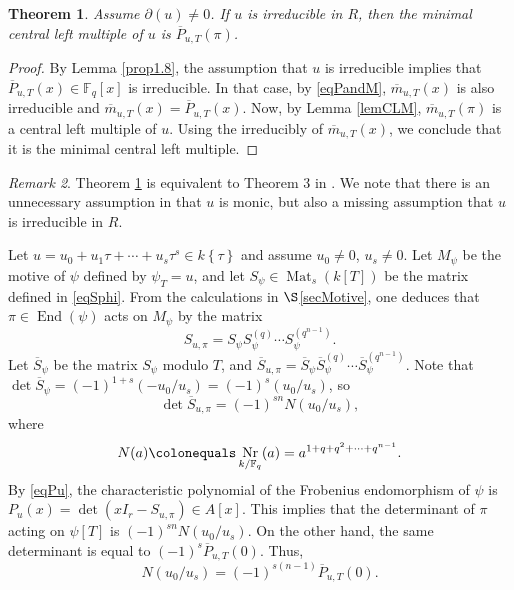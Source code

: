 \documentclass[12pt]{amsart}
\newtheorem{thm}{Theorem}[section]
\newtheorem{cor}[thm]{Corollary}
\theoremstyle{definition}
\theoremstyle{remark}
\newtheorem{rem}[thm]{Remark}
\numberwithin{equation}{section}
\numberwithin{thm}{section}
\DeclareMathOperator{\End}{End}
\DeclareMathOperator{\Mat}{Mat}
\DeclareMathOperator{\Nr}{Nr}
\newcommand{\F}{\mathbb{F}}
\newcommand{\twist}[1]{#1\!\left\{\tau\right\}}
\begin{document}


\begin{thm}\label{thm2.5} Assume $\partial(u)\neq 0$. 
	If $u$ is irreducible in $R$, then the minimal central left multiple of $u$ is $\overline{P}_{u, T}(\pi)$. 
\end{thm}
\begin{proof}
	By Lemma  \ref{prop1.8}, the assumption that $u$ is irreducible implies that 
	$\overline{P}_{u, T}(x)\in \F_q[x]$ is irreducible. In that case, by \eqref{eqPandM}, $\overline{m}_{u, T}(x)$ is also irreducible and 
	$\overline{m}_{u, T}(x)= \overline{P}_{u, T}(x)$. Now, by Lemma \ref{lemCLM}, $\overline{m}_{u, T}(\pi)$ is 
	a central left multiple of $u$. Using the irreducibly of $\overline{m}_{u, T}(x)$, we conclude that it is the 
	minimal central left multiple. 
\end{proof}

\begin{rem} Theorem \ref{thm2.5} is equivalent to Theorem 3 in \cite{Sheekey}. We note that there is an unnecessary assumption in \cite{Sheekey} that  
$u$ is monic, but also a missing assumption that $u$ 
	is irreducible in $R$. %
\end{rem}

Let $u=u_0+u_1\tau+\cdots+u_s\tau^s \in \twist{k}$ and assume $u_0\neq 0$, $u_s\neq 0$. 
Let $M_\psi$ be the motive of $\psi$ defined by $\psi_T=u$, and let  $S_\psi\in \Mat_{s}(k[T])$ be the matrix defined in \eqref{eqSphi}. From the calculations in 
$\S$\ref{secMotive}, one deduces that $\pi\in \End(\psi)$ acts on $M_\psi$ by the matrix 
$$S_{u, \pi}=S_\psi S_\psi^{(q)}\cdots S_\psi^{(q^{n-1})}.$$ 
Let $\overline{S}_{\psi}$ be the matrix $S_{\psi}$ modulo $T$, and 
$\overline{S}_{u, \pi}=\overline{S}_\psi\overline{S}_\psi^{(q)}\cdots \overline{S}_\psi^{(q^{n-1})}$. 
Note that 
$\det\overline{S}_{\psi}=(-1)^{1+s}(-u_0/u_s)=(-1)^s(u_0/u_s)$, 
so 
$$
\det \overline{S}_{u, \pi}= (-1)^{sn}N(u_0/u_s),
$$
where 
$$
N(a)\colonequals \Nr_{k/\F_q}(a)=a^{1+q+q^2+\cdots+q^{n-1}}. 
$$ 
By \eqref{eqPu}, the characteristic polynomial of the Frobenius endomorphism of $\psi$ is 
$P_{u}(x)=\det(xI_r-S_{u, \pi})\in A[x].$
This implies that the determinant of $\pi$ acting on $\psi[T]$ is 
$(-1)^{sn}N(u_0/u_s)$.  On the other hand, the same determinant is equal to $(-1)^s \overline{P}_{u, T}(0)$. Thus, 
\begin{equation}\label{eq1}
	N(u_0/u_s)=(-1)^{s(n-1)}\overline{P}_{u, T}(0). 
\end{equation}
\end{document}
